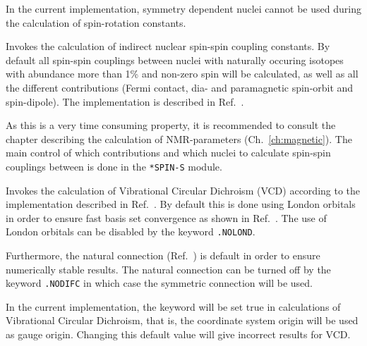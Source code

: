 \begin{description}
In the current implementation, symmetry dependent nuclei cannot be
used during the calculation of spin-rotation constants.

\item[\Key{SPIN-S}] Invokes the calculation of indirect nuclear
spin-spin coupling constants. By default all
spin-spin couplings 
between nuclei with naturally occuring isotopes with abundance more
than 1\% and non-zero spin will be calculated, as well as all the different
contributions (Fermi contact, dia- and paramagnetic spin-orbit and
spin-dipole). The implementation is described in 
Ref.~\cite{ovhapjhjajsbpthjcp96}. 

As this is a very time consuming property, it is recommended to 
consult the chapter describing the calculation of NMR-parameters
(Ch.~\ref{ch:magnetic}). The main control of which
contributions and which nuclei to calculate spin-spin couplings
between is done in the \verb|*SPIN-S| module.

\item[\Key{VCD}] Invokes the calculation of Vibrational Circular
Dichroism (VCD)
according to the implementation described in 
Ref.~\cite{klbpjthkrhjajjcp98}.  By default this is done using London
orbitals in order to 
ensure fast basis set convergence as shown in
Ref.~\cite{klbpjthkrhjajjcp100}. The use of London
orbitals can be disabled by the keyword \verb|.NOLOND|.

Furthermore, the natural connection
(Ref.~\cite{joklbkrthpjtca90,krthjopjklbcpl235}) is default in order to ensure
numerically stable results. The natural
connection can be turned off by the keyword \verb|.NODIFC| in which
case the symmetric connection will be used.


In the current implementation, the keyword  will be set
true in calculations of Vibrational Circular Dichroism, that is, the
coordinate system origin will be used as gauge origin. Changing this
default value will give incorrect results for VCD.


\end{description}
